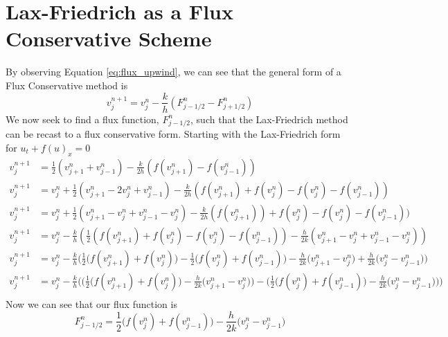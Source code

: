 \section{Lax-Friedrich as a Flux Conservative Scheme}
By observing Equation \ref{eq:flux_upwind}, we can see that the general form of a Flux Conservative method is
\begin{equation}\label{eq:gen_flux}
  v^{n+1}_j = v^n_j - \frac{k}{h}(F^n_{j-1/2} - F^n_{j+1/2})
\end{equation}
We now seek to find a flux function, $F^n_{j-1/2}$, such that the Lax-Friedrich method can be recast to a flux conservative form. Starting with the Lax-Friedrich form for $u_t + f(u)_x = 0$
\begin{align*}
  v^{n+1}_j &= \frac{1}{2}(v^n_{j+1} + v^n_{j-1}) - \frac{k}{2h}(f(v^n_{j+1})-f(v^n_{j-1})) \\
  v^{n+1}_j &= v^n_j + \frac{1}{2}(v^n_{j+1} - 2v^n_j + v^n_{j-1}) - \frac{k}{2h}(f(v^n_{j+1}) +f(v^n_j) -f(v^n_j) -f(v^n_{j-1})) \\
  v^{n+1}_j &= v^n_j + \frac{1}{2}(v^n_{j+1} - v^n_j + v^n_{j-1} - v^n_j) - \frac{k}{2h}(f(v^n_{j+1})) +f(v^n_j) -f(v^n_j) -f(v^n_{j-1})) \\
  v^{n+1}_j &= v^n_j - \frac{k}{h}(\frac{1}{2}(f(v^n_{j+1}) +f(v^n_j) -f(v^n_j) -f(v^n_{j-1})) - \frac{h}{2k}(v^n_{j+1} - v^n_j + v^n_{j-1} - v^n_j)) \\
  v^{n+1}_j &= v^n_j - \frac{k}{h}\Bigg(\frac{1}{2}\big(f(v^n_{j+1}) +f(v^n_j)\big) - \frac{1}{2}\big(f(v^n_j) +f(v^n_{j-1})\big) - \frac{h}{2k}\big(v^n_{j+1} - v^n_j\big) +  \frac{h}{2k}\big(v^n_j - v^n_{j-1}\big)\Bigg) \\
  v^{n+1}_j &= v^n_j - \frac{k}{h}\Bigg(\bigg(\frac{1}{2}\big(f(v^n_{j+1}) +f(v^n_j)\big)- \frac{h}{2k}\big(v^n_{j+1} - v^n_j\big)\bigg) - \bigg(\frac{1}{2}\big(f(v^n_j) +f(v^n_{j-1})\big)  -  \frac{h}{2k}\big(v^n_j - v^n_{j-1}\big) \bigg) \Bigg) \\
\end{align*}
Now we can see that our flux function is
\begin{equation}
  F^n_{j-1/2} = \frac{1}{2}\big(f(v^n_j) +f(v^n_{j-1})\big)  -  \frac{h}{2k}\big(v^n_j - v^n_{j-1}\big)
\end{equation}
